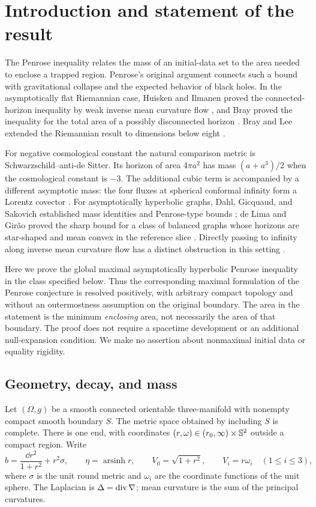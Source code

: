 \section{Introduction and statement of the result}
\label{sec:hypotheses}

The Penrose inequality relates the mass of an initial-data set to the
area needed to enclose a trapped region. Penrose's original argument
\citep{Penrose1973} connects such a bound with gravitational collapse
and the expected behavior of black holes. In the asymptotically flat
Riemannian case, Huisken and Ilmanen proved the connected-horizon
inequality by weak inverse mean curvature flow \citep{HI2001}, and
Bray proved the inequality for the total area of a possibly disconnected
horizon \citep{Bray2001}. Bray and Lee extended the Riemannian result to
dimensions below eight \citep{BrayLee2009}.

For negative cosmological constant the natural comparison metric is
Schwarzschild--anti-de Sitter. Its horizon of area $4\pi a^2$ has mass
$(a+a^3)/2$ when the cosmological constant is $-3$.
The additional cubic term is accompanied by a different asymptotic mass:
the four fluxes at spherical conformal infinity form a Lorentz covector
\citep{CH2003}. For asymptotically hyperbolic graphs,
Dahl, Gicquaud, and Sakovich established mass identities and Penrose-type
bounds \citep{DGS2013}; de Lima and Gir\~ao proved the sharp bound for
a class of balanced graphs whose horizons are star-shaped and mean
convex in the reference slice
\citep{deLimaGirao2016}. Directly passing to infinity along
inverse mean curvature flow has a distinct obstruction in this setting
\citep{Neves2010}.

Here we prove the global maximal asymptotically hyperbolic Penrose
inequality in the class specified below. Thus the corresponding maximal
formulation of the Penrose conjecture is resolved positively, with
arbitrary compact topology and without an outermostness assumption on
the original boundary. The area in the statement is the minimum
\emph{enclosing} area, not necessarily the area of that boundary.
The proof does not require a spacetime development or an additional
null-expansion condition. We make no assertion about nonmaximal
initial data or equality rigidity.

\subsection{Geometry, decay, and mass}

Let $(\Omega,g)$ be a smooth connected orientable three-manifold with
nonempty compact smooth boundary $S$. The metric space obtained by
including $S$ is complete. There is one end, with coordinates
$(r,\omega)\in(r_0,\infty)\times\mathbb S^2$ outside a compact region.
Write
\begin{equation}\label{eq:background}
 b=\frac{\dd r^2}{1+r^2}+r^2\sigma,
 \qquad \eta=\operatorname{arsinh}r,
 \qquad V_0=\sqrt{1+r^2},\qquad V_i=r\omega_i\quad(1\le i\le3),
\end{equation}
where $\sigma$ is the unit round metric and $\omega_i$ are the coordinate
functions of the unit sphere. The Laplacian is $\Delta=\operatorname{div}\nabla$;
mean curvature is the sum of the principal curvatures.

